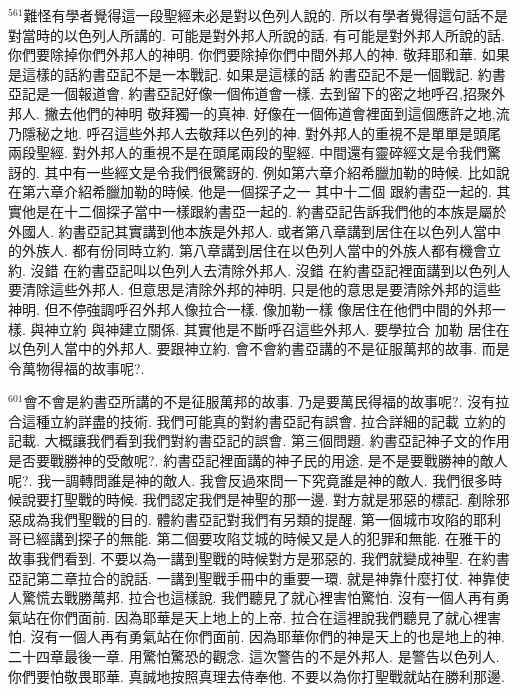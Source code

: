 \documentclass{book}
\begin{document}
$^{561}$難怪有學者覺得這一段聖經未必是對以色列人說的.
所以有學者覺得這句話不是對當時的以色列人所講的.
可能是對外邦人所說的話.
有可能是對外邦人所說的話.
你們要除掉你們外邦人的神明.
你們要除掉你們中間外邦人的神.
敬拜耶和華.
如果是這樣的話約書亞記不是一本戰記.
如果是這樣的話 約書亞記不是一個戰記.
約書亞記是一個報道會.
約書亞記好像一個佈道會一樣.
去到留下的密之地呼召,招聚外邦人.
撇去他們的神明 敬拜獨一的真神.
好像在一個佈道會裡面到這個應許之地,流乃隱秘之地.
呼召這些外邦人去敬拜以色列的神.
對外邦人的重視不是單單是頭尾兩段聖經.
對外邦人的重視不是在頭尾兩段的聖經.
中間還有靈碎經文是令我們驚訝的.
其中有一些經文是令我們很驚訝的.
例如第六章介紹希臘加勒的時候.
比如說在第六章介紹希臘加勒的時候.
他是一個探子之一 其中十二個 跟約書亞一起的.
其實他是在十二個探子當中一樣跟約書亞一起的.
約書亞記告訴我們他的本族是屬於外國人.
約書亞記其實講到他本族是外邦人.
或者第八章講到居住在以色列人當中的外族人.
都有份同時立約.
第八章講到居住在以色列人當中的外族人都有機會立約.
沒錯 在約書亞記叫以色列人去清除外邦人.
沒錯 在約書亞記裡面講到以色列人要清除這些外邦人.
但意思是清除外邦的神明.
只是他的意思是要清除外邦的這些神明.
但不停強調呼召外邦人像拉合一樣.
像加勒一樣 像居住在他們中間的外邦一樣.
與神立約 與神建立關係.
其實他是不斷呼召這些外邦人.
要學拉合 加勒 居住在以色列人當中的外邦人.
要跟神立約.
會不會約書亞講的不是征服萬邦的故事.
而是令萬物得福的故事呢?.

$^{601}$會不會是約書亞所講的不是征服萬邦的故事.
乃是要萬民得福的故事呢?.
沒有拉合這種立約詳盡的技術.
我們可能真的對約書亞記有誤會.
拉合詳細的記載 立約的記載.
大概讓我們看到我們對約書亞記的誤會.
第三個問題.
約書亞記神子文的作用是否要戰勝神的受敵呢?.
約書亞記裡面講的神子民的用途.
是不是要戰勝神的敵人呢?.
我一調轉問誰是神的敵人.
我會反過來問一下究竟誰是神的敵人.
我們很多時候說要打聖戰的時候.
我們認定我們是神聖的那一邊.
對方就是邪惡的標記.
剷除邪惡成為我們聖戰的目的.
體約書亞記對我們有另類的提醒.
第一個城市攻陷的耶利哥已經講到探子的無能.
第二個要攻陷艾城的時候又是人的犯罪和無能.
在雅干的故事我們看到.
不要以為一講到聖戰的時候對方是邪惡的.
我們就變成神聖.
在約書亞記第二章拉合的說話.
一講到聖戰手冊中的重要一環.
就是神靠什麼打仗.
神靠使人驚慌去戰勝萬邦.
拉合也這樣說.
我們聽見了就心裡害怕驚怕.
沒有一個人再有勇氣站在你們面前.
因為耶華是天上地上的上帝.
拉合在這裡說我們聽見了就心裡害怕.
沒有一個人再有勇氣站在你們面前.
因為耶華你們的神是天上的也是地上的神.
二十四章最後一章.
用驚怕驚恐的觀念.
這次警告的不是外邦人.
是警告以色列人.
你們要怕敬畏耶華.
真誠地按照真理去侍奉他.
不要以為你打聖戰就站在勝利那邊.
\end{document}
